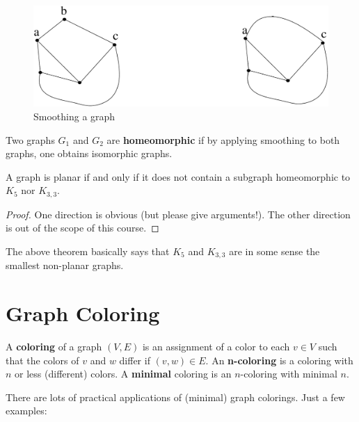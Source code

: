 \begin{figure}[ht]
\begin{center}
\includegraphics[width=0.4\linewidth,keepaspectratio]{rij1}
\end{center}
\caption{Smoothing a graph \label{rij1}}
\end{figure}

\begin{definition}
  \textup{Two graphs $G_{1}$ and $G_{2}$ are \textbf{homeomorphic} if
by applying smoothing to both graphs, one obtains isomorphic graphs.}
\end{definition}

 \begin{theorem}
A graph is planar if and only if it does not contain a subgraph
homeomorphic to $K_{5}$ nor $K_{3,3}$.
\end{theorem}
\begin{proof}
One direction is obvious (but please give arguments!). The other direction
is out of the scope of this course.
\end{proof}

The above theorem basically says that $K_{5}$ and $K_{3,3}$ are in
some sense the smallest non-planar graphs.


\section{Graph Coloring}

 \begin{definition}
\textup{A \textbf{coloring} of a graph $(V,E)$ is an assignment of a
  color to each $v \in V$ such that the colors of $v$ and $w$ differ
  if $(v,w) \in E$. An
  \mbox{\textbf{n-coloring}} is a coloring with $n$ or less
  (different) colors. A \textbf{minimal} coloring is an $n$-coloring
  with minimal $n$.}
\end{definition}

There are lots of practical applications of (minimal) graph colorings.
Just a few examples:

